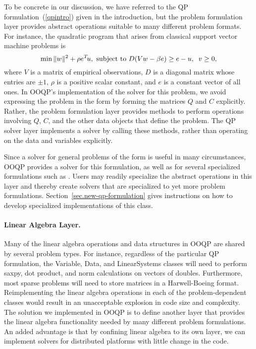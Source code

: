 To be concrete in our discussion, we have referred to the QP
formulation~(\ref{qpintro}) given in the introduction, but the problem
formulation layer provides abstract operations suitable to many
different problem formats. For instance, the quadratic program that
arises from classical support vector machine problems is
\begin{equation}
  \label{svm-formulation}
    \min  \norm{w}^2 + \rho e\T u, \ 
    \subject \ D ( V w - \beta e ) \geq  e - u, \;\; v \ge 0,
\end{equation}
where $V$ is a matrix of empirical observations, $D$ is a diagonal
matrix whose entries are $\pm 1$, $\rho$ is a positive scalar
constant, and $e$ is a constant vector of all ones. In OOQP's
implementation of the solver for this problem, we avoid expressing the
problem in the form \eqnok{qpgen} by forming the matrices $Q$ and $C$
explicitly. Rather, the problem formulation layer provides methods to
perform operations involving $Q$, $C$, and the other data objects that
define the problem. The QP solver layer implements a solver by calling
these methods, rather than operating on the data and variables
explicitly.

Since a solver for general problems of the form  is
useful in many circumstances, OOQP provides a solver for this
formulation, as well as for several specialized formulations such as
\eqnok{svm-formulation}. Users may readily specialize the abstract
operations in this layer and thereby create solvers that are
specialized to yet more problem formulations.
Section~\ref{sec.new-qp-formulation} gives instructions on how to
develop specialized implementations of this class.
 
\paragraph{Linear Algebra Layer.} 

Many of the linear algebra operations and data structures in OOQP are
shared by several problem types.  For instance, regardless of the
particular QP formulation, the Variable, Data, and LinearSystems
classes will need to perform saxpy, dot product, and norm calculations
on vectors of doubles.  Furthermore, most sparse problems will need to
store matrices in a Harwell-Boeing format. Reimplementing the linear
algebra operations in each of the problem-dependent classes would
result in an unacceptable explosion in code size and complexity. The
solution we implemented in OOQP is to define another layer that
provides the linear algebra functionality needed by many different
problem formulations. An added advantage is that by confining linear
algebra to its own layer, we can implement solvers for distributed
platforms with little change in the code.

